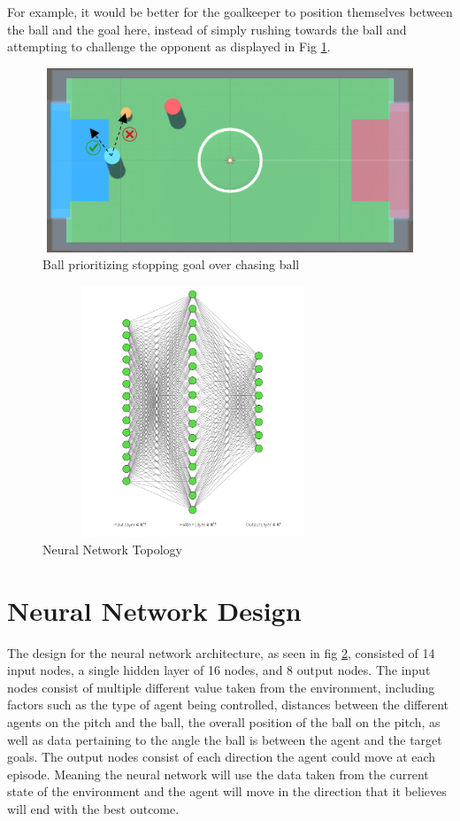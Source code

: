 \begin{flushleft}
For example, it would be better for the goalkeeper to position themselves between the ball and the goal here, instead of simply rushing towards the ball and attempting to challenge the opponent as displayed in Fig \ref{fig:sd5}.
\end{flushleft}

\begin{figure}[H]
    \centering
    \includegraphics[width=115mm, height=55mm]{img/Image4.png}
    \caption{Ball prioritizing stopping goal over chasing ball}
    \label{fig:sd5}
\end{figure}

\begin{figure}[H]
    \centering
    \includegraphics[width=90mm, height=75mm]{img/NeuralNet.PNG}
    \caption{Neural Network Topology}
    \label{fig:NN-T}
\end{figure}

\section{Neural Network Design}
The design for the neural network architecture, as seen in fig \ref{fig:NN-T}, consisted of 14 input nodes, a single hidden layer of 16 nodes, and 8 output nodes. The input nodes consist of multiple different value taken from the environment, including factors such as the type of agent being controlled, distances between the different agents on the pitch and the ball, the overall position of the ball on the pitch, as well as data pertaining to the angle the ball is between the agent and the target goals. The output nodes consist of each direction the agent could move at each episode. Meaning the neural network will use the data taken from the current state of the environment and the agent will move in the direction that it believes will end with the best outcome.

